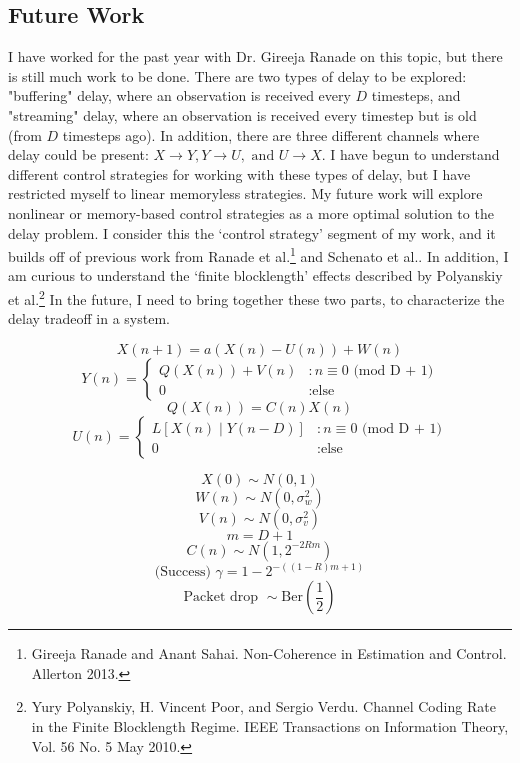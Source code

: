 \documentclass[10pt]{article}
\begin{document}

\subsection*{Future Work}
I have worked for the past year with Dr. Gireeja Ranade on this topic, but there is still much work to be done. There are two types of delay to be explored: "buffering" delay, where an observation is received every $D$ timesteps, and "streaming" delay, where an observation is received every timestep but is old (from $D$ timesteps ago). In addition, there are three different channels where delay could be present: $X \to Y, Y \to U, \text{ and } U \to X$. I have begun to understand different control strategies for working with these types of delay, but I have restricted myself to linear memoryless strategies. My future work will explore nonlinear or memory-based control strategies as a more optimal solution to the delay problem. I consider this the `control strategy' segment of my work, and it builds off of previous work from Ranade et al.\footnote{Gireeja Ranade and Anant Sahai. Non-Coherence in Estimation and Control. Allerton 2013.} and Schenato et al.\footnotemark[1]. In addition, I am curious to understand the `finite blocklength' effects described by Polyanskiy et al.\footnote{Yury Polyanskiy, H. Vincent Poor, and Sergio Verdu. Channel Coding Rate in the Finite Blocklength Regime. IEEE Transactions on Information Theory, Vol. 56 No. 5 May 2010.} In the future, I need to bring together these two parts, to characterize the delay tradeoff in a system.

\[ X(n+1) = a(X(n) - U(n)) + W(n) \]
\[ Y(n) = \left\{
     \begin{array}{ll}
       Q(X(n)) + V(n) & : n \equiv 0 \text{ (mod D + 1)}\\
       0 & : \text{else}
     \end{array}
   \right. \]
\[ Q(X(n)) = C(n)X(n) \]
\[ U(n) = \left\{
     \begin{array}{ll}
       L[X(n) \; | \; Y(n-D)] & : n \equiv 0 \text{ (mod  D + 1)}\\
       0 & : \text{else}
     \end{array}
   \right. \]
\newpage
\twocolumn   
   
\[ X(0) \sim N(0,1) \]
\[ W(n) \sim N \left( 0, \sigma^2_w \right) \]
\[ V(n) \sim N \left( 0, \sigma^2_v \right) \]
\[ m = D + 1 \]
\[ C(n) \sim N \left( 1, 2^{-2Rm} \right) \]
\[ \text{(Success) } \gamma  = 1 - 2^{-((1-R)m + 1)} \]
\[ \text{Packet drop } \sim \text{Ber} \left( \frac{1}{2} \right) \]

\end{document}
